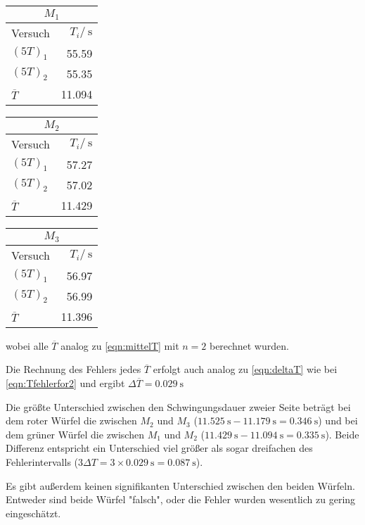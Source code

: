		\begin{multicols}{3}
			\begin{center}
				\begin{tabular}{lr}
				\multicolumn{2}{c}{$M_1$} \\
				\toprule
				Versuch & $T_i / \SI{}{\second}$ \\
				\midrule
				$(5T)_1$ & \SI{55,59}{} \\
				$(5T)_2$ & \SI{55,35}{} \\
				$\overbar{T}$ & \SI{11,094}{} \\
				\bottomrule
				\end{tabular}
			\end{center}
			\begin{center}
				\begin{tabular}{lr}
				\multicolumn{2}{c}{$M_2$} \\
				\toprule
				Versuch & $T_i / \SI{}{\second}$ \\
				\midrule
				$(5T)_1$ & \SI{57,27}{} \\
				$(5T)_2$ & \SI{57,02}{} \\
				$\overbar{T}$ & \SI{11,429}{} \\
				\bottomrule
				\end{tabular}
			\end{center}
			\begin{center}
				\begin{tabular}{lr}
				\multicolumn{2}{c}{$M_3$} \\
				\toprule
				Versuch & $T_i / \SI{}{\second}$ \\
				\midrule
				$(5T)_1$ & \SI{56,97}{} \\
				$(5T)_2$ & \SI{56,99}{} \\
				$\overbar{T}$ & \SI{11.396}{} \\
				\bottomrule
				\end{tabular}
			\end{center}
		\end{multicols}
		wobei alle $\overbar{T}$ analog zu \eqref{eqn:mittelT} mit $n = 2$ berechnet wurden.

		Die Rechnung des Fehlers jedes $\overbar{T}$ erfolgt auch analog zu \eqref{eqn:deltaT} wie bei \eqref{eqn:Tfehlerfor2} und ergibt $\Delta \overbar{T} = \SI{0.029}{\second}$

		Die größte Unterschied zwischen den Schwingungsdauer zweier Seite beträgt bei dem roter Würfel die zwischen $M_2$ und $M_3$ ($\SI{11.525}{\second} - \SI{11.179}{\second} = \SI{0.346}{\second}$) und bei dem grüner Würfel die zwischen $M_1$ und $M_2$ ($\SI{11,429}{\second} - \SI{11,094}{\second} = \SI{0.335}{\second}$). Beide Differenz entspricht ein Unterschied viel größer als sogar dreifachen des Fehlerintervalls ($3\Delta T = 3 \times \SI{0.029}{\second} = \SI{0.087}{\second}$).

		Es gibt außerdem keinen signifikanten Unterschied zwischen den beiden Würfeln. Entweder sind beide Würfel "falsch", oder die Fehler wurden wesentlich zu gering eingeschätzt.

